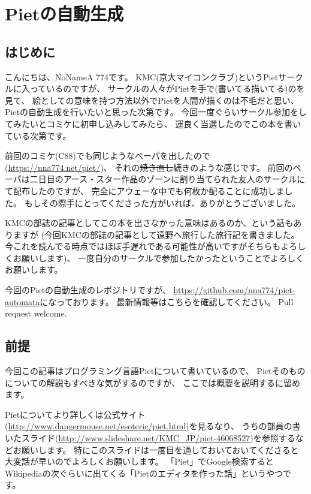 \chapter[Pietの自動生成]{Pietの自動生成}

\section{はじめに}

こんにちは、NoNameA 774です。
KMC(京大マイコンクラブ)というPietサークルに入っているのですが、
サークルの人々がPietを手で(書いてる\textbar{}描いてる)のを見て、
絵としての意味を持つ方法以外でPietを人間が描くのは不毛だと思い、
Pietの自動生成を行いたいと思った次第です。
今回一度ぐらいサークル参加をしてみたいとコミケに初申し込みしてみたら、
運良く当選したのでこの本を書いている次第です。

前回のコミケ(C88)でも同じようなペーパを出したので(\url{https://nna774.net/piet/})、
それの\sout{焼き直し}続きのような感じです。
前回のペーパは二日目のアース・スター作品のゾーンに割り当てられた友人のサークルにて配布したのですが、
完全にアウェーな中でも何枚か配ることに成功しました。
もしその際手にとってくださった方がいれば、ありがとうございました。

KMCの部誌の記事としてこの本を出さなかった意味はあるのか、という話もありますが
(今回KMCの部誌の記事として遠野へ旅行した旅行記を書きました。
今これを読んでる時点ではほぼ手遅れである可能性が高いですがそちらもよろしくお願いします)、
一度自分のサークルで参加したかったということでよろしくお願いします。

今回のPietの自動生成のレポジトリですが、
\url{https://github.com/nna774/piet-automata}になっております。
最新情報等はこちらを確認してください。
Pull request welcome.

\section{前提}

今回この記事はプログラミング言語Pietについて書いているので、
Pietそのものについての解説もすべきな気がするのですが、
ここでは概要を説明するに留めます。

Pietについてより詳しくは公式サイト(\url{http://www.dangermouse.net/esoteric/piet.html})を見るなり、
うちの部員の書いたスライド(\url{http://www.slideshare.net/KMC\_JP/piet-46068527})を参照するなどお願いします。
特にこのスライドは一度目を通しておいておいてくださると大変話が早いのでよろしくお願いします。
「Piet」でGoogle検索するとWikipediaの次ぐらいに出てくる「Pietのエディタを作った話」というやつです。

